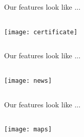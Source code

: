 \documentclass{beamer}
\begin{document}
\begin{frame}{Our features look like ...}
	\begin{columns}
		\begin{column}{5cm}
			\begin{center}
				\texttt{[image: certificate]}
				
				{\tiny \textcolor{digiPH_darkorange}{ }}
			\end{center}
		\end{column}
		\begin{column}{5cm}
			\begin{center}
				\Large
			
			\end{center}
			
		\end{column}
	\end{columns}
\end{frame}



\begin{frame}{Our features look like ...}
	\begin{columns}
		\begin{column}{5cm}
			\begin{center}
				\texttt{[image: news]}
				
				{\tiny \textcolor{digiPH_darkorange}{ }}
			\end{center}
		\end{column}
		\begin{column}{5cm}
			\begin{center}
				\Large
			
			\end{center}
			
		\end{column}
	\end{columns}
\end{frame}



\begin{frame}{Our features look like ...}
	\begin{columns}
		\begin{column}{5cm}
			\begin{center}
				\texttt{[image: maps]}
				
				{\tiny \textcolor{digiPH_darkorange}{ }}
			\end{center}
		\end{column}
		\begin{column}{5cm}
			\begin{center}
				\Large
			
			\end{center}
			
		\end{column}
	\end{columns}
\end{frame}
\end{document}
